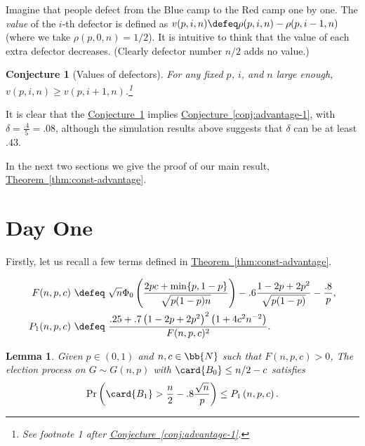 \documentclass[11pt]{article}
\numberwithin{equation}{section}
\newtheorem{lemma}[theorem]{Lemma}
\newtheorem{conjecture}[theorem]{Conjecture}
\theoremstyle{definition}
\theoremstyle{plain}
\newcommand{\expref}[2]{\hyperref[#2]{#1~\ref{#2}}}
\begin{document}
			Imagine that people defect from
			the  %
			Blue camp to
			the  %
			Red camp one by one. The \emph{value} of the
			$i$-th  %
			defector is defined as $v(p, i,n) \defeq \rho (p, i,n) - \rho (p, i-1, n)$ (where we take $\rho (p, 0, n) = 1/2 $). It is intuitive to think that the value of each extra defector decreases. (Clearly defector number $n/2$ adds no value.)
			
			\begin{conjecture}[Values of defectors] \label{conj:defectors}
				For any fixed $p$, $i$, and $n$ large enough, $v(p, i,n) \ge v(p, i+1, n)$.\footnote[2]{See footnote 1 after \expref{Conjecture}{conj:advantage-1}.}
			\end{conjecture}
			
			
			It is clear that the \expref{Conjecture}{conj:defectors} implies \expref{Conjecture}{conj:advantage-1}, with $\delta = \frac{.4}{5} =.08 $, although the simulation results above suggests that $\delta$ can be at least $.43$.
			
			In the next two sections we give the proof of our main result, \expref{Theorem}{thm:const-advantage}.
			
			

			\section{Day One} \label{sec:firstday-const}
			
			
			Firstly, let us recall a few terms defined in \expref{Theorem}{thm:const-advantage}.
			\begin{linenomath}\begin{equation*}
					\begin{aligned}
						F(n, p, c) & \ \defeq \ \sqrt{n}\Phi_0\left(\frac{2pc  %
							+ \min\{p, 1 - p\}  %
						}{\sqrt{p(1 - p)n}} \right) - .6\frac{1 - 2p + 2p^2}{\sqrt{p(1 - p)}} - \frac{.8}{p}, \\
						P_1(n, p, c) & \ \defeq \ \frac{.25 + .7\left(1 - 2p + 2p^2\right)^2 \left(1 + 4c^2n^{-2}\right)}
						{F(n, p, c)^2}.
					\end{aligned}
			\end{equation*}\end{linenomath}
			
			\begin{lemma} \label{lem:const-advantage-day-1}
				Given $p \in (0, 1)$ and $n, c\in \bb{N}$ such that 
				$F(n, p, c)  > 0$,
				The election process on $G\sim G(n, p)$ with $\card{B_0}\le n/2 - c$ satisfies
				\[ \label{eq:const-advantage-day-1}
				\Pr \left(\card{B_1} > \frac{n}{2} - .8\frac{\sqrt{n}}{p}\right) \le P_1\left(n, p, c\right).
				\]
			\end{lemma}
			
\end{document}
